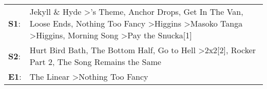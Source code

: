 \begin{supertabular}{p{0.03\textwidth}p{0.92\textwidth}}
 \textbf{S1}:  &  Jekyll \& Hyde\textsuperscript{} \textgreater {}'s Theme\textsuperscript{}, \enspace Anchor Drops\textsuperscript{}, \enspace Get In The Van\textsuperscript{}, \enspace Loose Ends\textsuperscript{}, \enspace Nothing Too Fancy\textsuperscript{} \textgreater \enspace Higgins\textsuperscript{} \textgreater \enspace Masoko Tanga\textsuperscript{} \textgreater \enspace Higgins\textsuperscript{}, \enspace Morning Song\textsuperscript{} \textgreater \enspace Pay the Snucka[1]\textsuperscript{}  \enspace  \\
 \textbf{S2}:  &                                                                                                                                                                                                                                                    Hurt Bird Bath\textsuperscript{}, \enspace The Bottom Half\textsuperscript{}, \enspace Go to Hell\textsuperscript{} \textgreater \enspace 2x2[2]\textsuperscript{}, \enspace Rocker Part 2\textsuperscript{}, \enspace The Song Remains the Same\textsuperscript{}  \enspace  \\
 \textbf{E1}:  &                                                                                                                                                                                                                                                                                                                                                                                                                                The Linear\textsuperscript{} \textgreater \enspace Nothing Too Fancy\textsuperscript{}  \enspace  \\
\end{supertabular}
